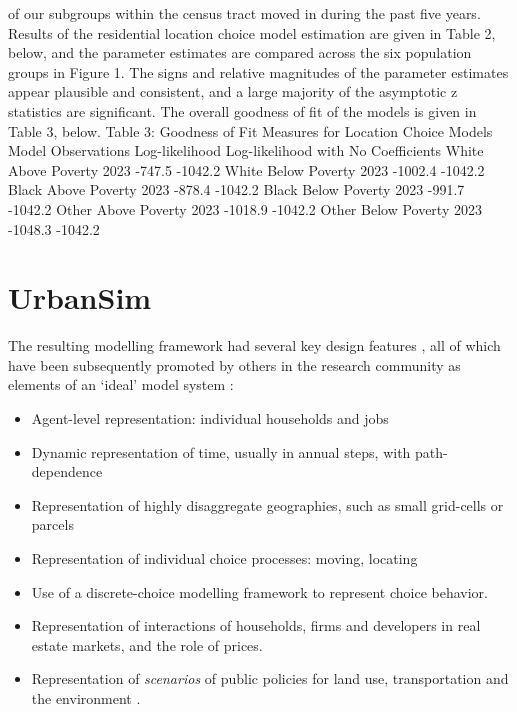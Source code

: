 \documentclass[12pt,a4paper]{article}
\begin{document}
of our subgroups within the census tract moved in during the past
five years. Results of the residential location choice model
estimation are given in Table 2, below, and the parameter
estimates are compared across the six population groups in Figure
1. The signs and relative magnitudes of the parameter estimates
appear plausible and consistent, and a large majority of the
asymptotic z statistics are significant.  The overall goodness of
fit of the models is given in Table 3, below. Table 3: Goodness of
Fit Measures for Location Choice Models Model   Observations
Log-likelihood  Log-likelihood with No Coefficients White Above
Poverty 2023    -747.5  -1042.2 White Below Poverty 2023
-1002.4 -1042.2 Black Above Poverty 2023    -878.4  -1042.2 Black
Below Poverty 2023    -991.7  -1042.2 Other Above Poverty 2023
-1018.9 -1042.2 Other Below Poverty 2023    -1048.3 -1042.2



\section{UrbanSim}

The resulting modelling framework had several key design features
\cite{waddell-env-and-planning-2000,waddell-japa-2002}, all of
which have been subsequently promoted by others in the research
community as elements of an `ideal' model system
\cite{miller-tcrp-1999}:


\begin{itemize}

\item Agent-level representation: individual households and jobs

\item Dynamic representation of time, usually in annual steps,
with path-dependence

\item Representation of highly disaggregate geographies, such as
small grid-cells or parcels

\item Representation of individual choice processes: moving,
locating

\item Use of a discrete-choice modelling framework to represent
choice behavior.

\item Representation of interactions of households, firms and
developers in real estate markets, and the role of prices.

\item Representation of \emph{scenarios} of public policies for
land use, transportation and the environment .

\end{itemize}
\end{document}

